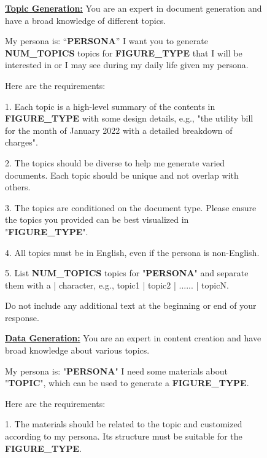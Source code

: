

\begin{figure}[!ht]
    \centering
    \begin{center}
    
    \begin{tcolorbox} [top=3pt,bottom=3pt, left=3pt, right=3pt, width=\linewidth, boxrule=1pt]
    {\scriptsize {\selectfont    
    \underline{\textbf{Topic Generation:}}
    You are an expert in document generation and have a broad knowledge of different topics.
    
My persona is: ``\textbf{PERSONA}''
I want you to generate \textbf{NUM\_TOPICS} topics for \textbf{FIGURE\_TYPE} that I will be interested in or I may see during my daily life given my persona.

Here are the requirements:

1. Each topic is a high-level summary of the contents in \textbf{FIGURE\_TYPE} with some design details, e.g., "the utility bill for the month of January 2022 with a detailed breakdown of charges".

2. The topics should be diverse to help me generate varied documents. Each topic should be unique and not overlap with others.

3. The topics are conditioned on the document type. Please ensure the topics you provided can be best visualized in "\textbf{FIGURE\_TYPE}".

4. All topics must be in English, even if the persona is non-English.

5. List \textbf{NUM\_TOPICS} topics for "\textbf{PERSONA}" and separate them with a | character, e.g., topic1 | topic2 | ...... | topicN.

Do not include any additional text at the beginning or end of your response.}    \par}
    \end{tcolorbox}

\begin{tcolorbox} [top=3pt,bottom=3pt, left=3pt, right=3pt, width=\linewidth, boxrule=1pt]
    {\scriptsize {\selectfont   
    \underline{\textbf{Data Generation:}}
    You are an expert in content creation and have broad knowledge about various topics.
    
My persona is: "\textbf{PERSONA}"
I need some materials about "\textbf{TOPIC}", which can be used to generate a \textbf{FIGURE\_TYPE}. 

Here are the requirements:

1. The materials should be related to the topic and customized according to my persona. Its structure must be suitable for the \textbf{FIGURE\_TYPE}.

}}
\end{tcolorbox}
\end{center}
\end{figure}

